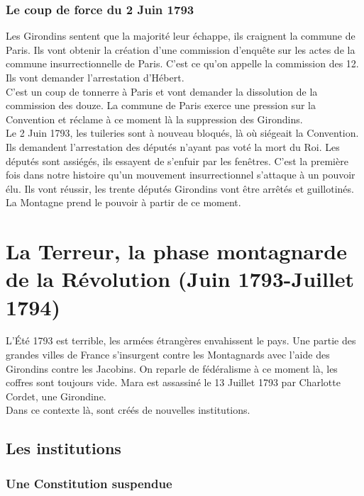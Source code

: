 \documentclass[10pt, a4paper, openany]{book}
\begin{document}
\subsubsection{Le coup de force du 2 Juin 1793}

Les Girondins sentent que la majorité leur échappe, ils craignent la commune de Paris. Ils vont obtenir la création d'une commission d'enquête sur les actes de la commune insurrectionnelle de Paris. C'est ce qu'on appelle la commission des 12. Ils vont demander l'arrestation d'Hébert. \\
C'est un coup de tonnerre à Paris et vont demander la dissolution de la commission des douze. La commune de Paris exerce une pression sur la Convention et réclame à ce moment là la suppression des Girondins. \\
Le 2 Juin 1793, les tuileries sont à nouveau bloqués, là où siégeait la Convention. Ils demandent l'arrestation des députés n'ayant pas voté la mort du Roi. Les députés sont assiégés, ils essayent de s'enfuir par les fenêtres. C'est la première fois dans notre histoire qu'un mouvement insurrectionnel s'attaque à un pouvoir élu. Ils vont réussir, les trente députés Girondins vont être arrêtés et guillotinés. \\
La Montagne prend le pouvoir à partir de ce moment.

\section{La Terreur, la phase montagnarde de la Révolution (Juin 1793-Juillet 1794)}

L'Été 1793 est terrible, les armées étrangères envahissent le pays. Une partie des grandes villes de France s'insurgent contre les Montagnards avec l'aide des Girondins contre les Jacobins. On reparle de fédéralisme à ce moment là, les coffres sont toujours vide. Mara est assassiné le 13 Juillet 1793 par Charlotte Cordet, une Girondine. \\
Dans ce contexte là, sont créés de nouvelles institutions. 

\subsection{Les institutions}


\subsubsection{Une Constitution suspendue}
\end{document}

